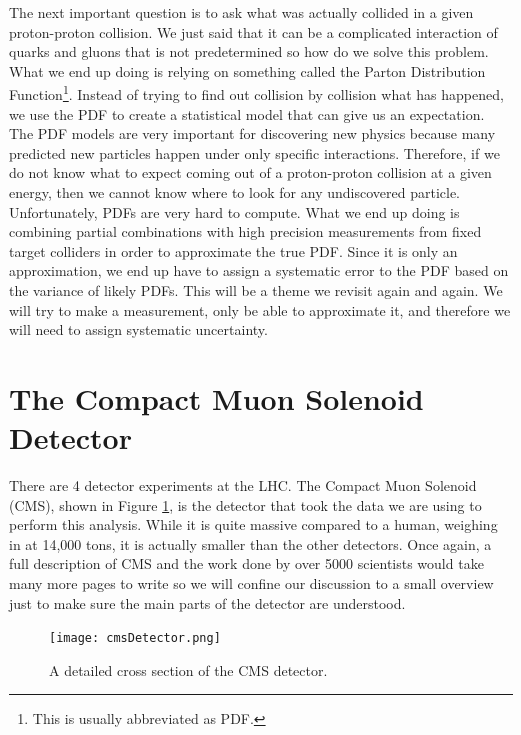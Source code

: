 The next important question is to ask what was actually collided in a given proton-proton collision.
We just said that it can be a complicated interaction of quarks and gluons that is not predetermined so how do we solve this problem.
What we end up doing is relying on something called the Parton Distribution Function\footnote{This is usually abbreviated as PDF.}. 
Instead of trying to find out collision by collision what has happened, we use the PDF to create a statistical model that can give us an expectation.
The PDF models are very important for discovering new physics because many predicted new particles happen under only specific interactions.
Therefore, if we do not know what to expect coming out of a proton-proton collision at a given energy, then we cannot know where to look for any undiscovered particle.
Unfortunately, PDFs are very hard to compute. What we end up doing is combining partial combinations with high precision measurements from fixed target colliders in order to approximate the true PDF.
Since it is only an approximation, we end up have to assign a systematic error to the PDF based on the variance of likely PDFs. 
This will be a theme we revisit again and again. We will try to make a measurement, only be able to approximate it, and therefore we will need to assign systematic uncertainty.

\section{The Compact Muon Solenoid Detector}
There are 4 detector experiments at the LHC. The Compact Muon Solenoid (CMS), shown in Figure \ref{fig:fig_3-3}, is the detector that took the data we are using to perform this analysis.
While it is quite massive compared to a human, weighing in at 14,000 tons, it is actually smaller than the other detectors.
Once again, a full description of CMS and the work done by over 5000 scientists would take many more pages to write so we will confine our discussion to a small overview just to make sure the main parts of the detector are understood.

\begin{figure} %
   \centering
   \texttt{[image: cmsDetector.png]}
   \caption{A detailed cross section of the CMS detector.}
   \label{fig:fig_3-3}
\end{figure}

\clearpage
